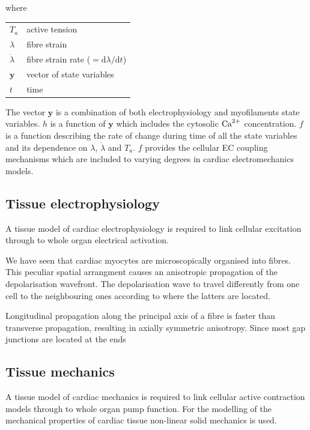 \noindent
where

\vspace{0.2cm}
\begin{tabular}{ll}
    $T_a$           & active tension \\
    $\lambda$       & fibre strain \\
    $\dot{\lambda}$ & fibre strain rate ($=\mathrm{d}\lambda / \mathrm{d}t$) \\
    $\mathbf{y}$    & vector of state variables \\
    $t$             & time
\end{tabular}

\vspace{0.5cm}\noindent
The vector $\mathbf{y}$ is a combination of both electrophysiology and myofilaments state variables. $h$ is a function of $\mathbf{y}$ which includes the cytosolic $\textrm{Ca}^{2+}$ concentration. $f$ is a function describing the rate of change during time of all the state variables and its dependence on $\lambda$, $\dot{\lambda}$ and $T_a$. $f$ provides the cellular EC coupling mechanisms which are included to varying degrees in cardiac electromechanics models.



%
%
%
\subsection{Tissue electrophysiology}\label{sec:tissue_ep_math_modelling}
A tissue model of cardiac electrophysiology is required to link cellular excitation through to whole organ electrical activation.

\vspace{0.2cm}
We have seen that cardiac myocytes are microscopically organised into fibres. This peculiar spatial arrangment causes an anisotropic propagation of the depolarisation wavefront. The depolarisation wave to travel differently from one cell to the neighbouring ones according to where the latters are located. 

Longitudinal propagation along the principal axis of a fibre is faster than transverse propagation, resulting in axially symmetric anisotropy. Since most gap junctions are located at the ends


%
%
%
\subsection{Tissue mechanics}\label{sec:tissue_mech_math_modelling}
A tissue model of cardiac mechanics is required to link cellular active contraction models through to whole organ pump function. For the modelling of the mechanical properties of cardiac tissue non-linear solid mechanics is used.

